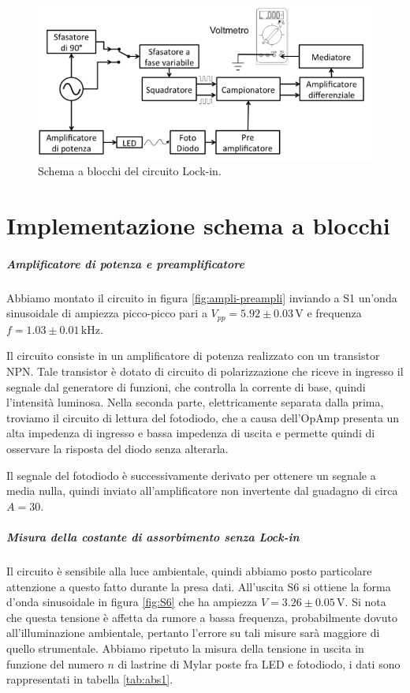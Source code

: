 \documentclass[10pt,a4paper]{article}
\begin{document}
\begin{figure}[!htb]
  \centering
  \includegraphics[scale=0.75]{schemablocchi.png}
\caption{Schema a blocchi del circuito Lock-in.\label{fig:schemablocchi}}
\end{figure}


\section{Implementazione schema a blocchi}

\subparagraph{Amplificatore di potenza e preamplificatore}
Abbiamo montato il circuito in figura \ref{fig:ampli-preampli} inviando a S1 un'onda sinusoidale di ampiezza picco-picco pari a $V_{pp}= 5.92\pm0.03 \,\mbox{V}$ e frequenza $f=1.03\pm0.01\,\mbox{kHz}$. 

Il circuito consiste in un amplificatore di potenza realizzato con un transistor NPN. Tale transistor è
dotato di circuito di polarizzazione che riceve in ingresso il segnale dal generatore di funzioni, che controlla la corrente di base, quindi l'intensità luminosa. Nella seconda parte, elettricamente separata dalla prima, troviamo il  circuito di lettura del fotodiodo, che a causa dell'OpAmp presenta un alta impedenza di ingresso e bassa impedenza di uscita e permette quindi di osservare la risposta del diodo senza alterarla.

Il segnale del fotodiodo è successivamente derivato per ottenere un segnale a media nulla, quindi inviato all'amplificatore non invertente dal guadagno di circa $A = 30$.\\ 

\subparagraph{Misura della costante di assorbimento senza Lock-in}
Il circuito è sensibile alla luce ambientale, quindi abbiamo posto particolare attenzione a questo fatto durante la presa dati. %
All'uscita S6 si ottiene la forma d'onda sinusoidale in figura \ref{fig:S6} che ha ampiezza $V=3.26\pm0.05\,\mbox{V}$. Si nota che questa tensione è affetta da rumore a bassa frequenza, probabilmente dovuto all'illuminazione ambientale, pertanto l'errore su tali misure sarà maggiore di quello strumentale.
Abbiamo ripetuto la misura della tensione in uscita in funzione del numero $n$ di lastrine di Mylar poste fra LED e fotodiodo, i dati sono rappresentati in tabella \ref{tab:abs1}. 
\end{document}
